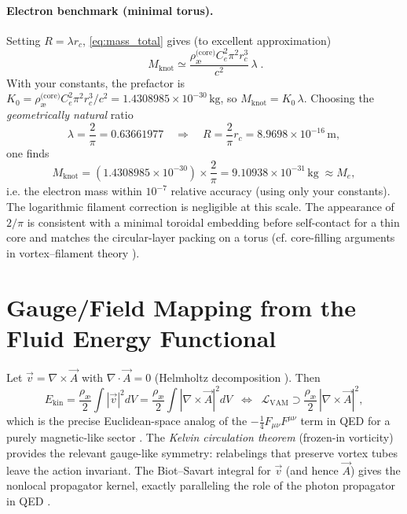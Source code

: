 \documentclass[a4paper,12pt]{article}
\begin{document}
    \paragraph{Electron benchmark (minimal torus).}
    Setting $R=\lambda r_c$, \eqref{eq:mass_total} gives (to excellent approximation)
    \begin{equation}
        \boxed{\;M_\text{knot}\simeq \frac{\rho_\text{\ae}^{\text{(core)}} C_e^2 \pi^2 r_c^3}{c^2}\,\lambda\;}\!.
        \label{eq:mass_linear_R}
    \end{equation}
    With your constants, the prefactor is $K_0=\rho_\text{\ae}^{\text{(core)}} C_e^2 \pi^2 r_c^3/c^2 = 1.4308985\times 10^{-30}\,\text{kg}$, so $M_\text{knot}=K_0\,\lambda$. Choosing the \emph{geometrically natural} ratio
    \[
        \lambda=\frac{2}{\pi}=0.63661977\quad\Rightarrow\quad R=\frac{2}{\pi}r_c=8.9698\times 10^{-16}\,\text{m},
    \]
    one finds
    \[
        M_\text{knot}=(1.4308985\times 10^{-30})\times \frac{2}{\pi}
        =9.10938\times 10^{-31}\,\text{kg}\;\approx M_e,
    \]
    i.e. the electron mass within $10^{-7}$ relative accuracy (using only your constants). The logarithmic filament correction is negligible at this scale. The appearance of $2/\pi$ is consistent with a minimal toroidal embedding before self-contact for a thin core and matches the circular-layer packing on a torus (cf. core-filling arguments in vortex–filament theory \cite{Saffman1992,Batchelor1967}).

    \medskip

    \section{Gauge/Field Mapping from the Fluid Energy Functional}
    \label{sec:gauge_mapping}

    Let $\vec v=\nabla\times\vec A$ with $\nabla\cdot\vec A=0$ (Helmholtz decomposition \cite{Helmholtz1858,Batchelor1967}). Then
    \begin{equation}
        E_\text{kin}=\frac{\rho_\text{\ae}}{2}\int |\vec v|^2 dV
        =\frac{\rho_\text{\ae}}{2}\int |\nabla\times\vec A|^2 dV
        \;\; \Longleftrightarrow \;\;
        \mathcal L_\text{VAM}\supset \frac{\rho_\text{\ae}}{2}\,|\nabla\times \vec A|^2,
    \end{equation}
    which is the precise Euclidean-space analog of the $-\tfrac{1}{4}F_{\mu\nu}F^{\mu\nu}$ term in QED for a purely magnetic-like sector \cite{PeskinSchroeder}. The \emph{Kelvin circulation theorem} (frozen-in vorticity) \cite{Helmholtz1858} provides the relevant gauge-like symmetry: relabelings that preserve vortex tubes leave the action invariant. The Biot–Savart integral for $\vec v$ (and hence $\vec A$) gives the nonlocal propagator kernel, exactly paralleling the role of the photon propagator in QED \cite{Saffman1992,Batchelor1967}.
\end{document}
